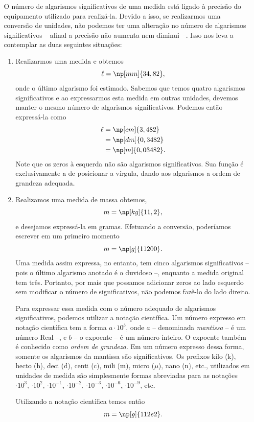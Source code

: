 O número de algarismos significativos de uma medida está ligado à precisão do equipamento utilizado para realizá-la. Devido a isso, se realizarmos uma conversão de unidades, não podemos ter uma alteração no número de algarismos significativos -- afinal a precisão não aumenta nem diminui~--. Isso nos leva a contemplar as duas seguintes situações:
\begin{enumerate}
\item Realizarmos uma medida e obtemos
\begin{equation}
	\ell = \np[mm]{34,82},
\end{equation}
%
onde o último algarismo foi estimado. Sabemos que temos quatro algarismos significativos e ao expressarmos esta medida em outras unidades, devemos manter o mesmo número de algarismos significativos. Podemos então expressá-la como
\begin{align}
	\ell &= \np[cm]{3,482} \\
	&= \np[dm]{0,3482} \\
	&= \np[m]{0,03482}.
\end{align}
%
Note que os zeros à esquerda não são algarismos significativos. Sua função é exclusivamente a de posicionar a vírgula, dando aos algarismos a ordem de grandeza adequada.

\item Realizamos uma medida de massa obtemos,
\begin{equation}
	m = \np[kg]{11,2},
\end{equation}
%
e desejamos expressá-la em gramas. Efetuando a conversão, poderíamos escrever em um primeiro momento
\begin{equation}
	m = \np[g]{11200}.
\end{equation}
%
Uma medida assim expressa, no entanto, tem cinco algarismos significativos -- pois o último algarismo anotado é o duvidoso --, enquanto a medida original tem três.  Portanto, por mais que possamos adicionar zeros ao lado esquerdo sem modificar o número de significativos, não podemos fazê-lo do lado direito. 

Para expressar essa medida com o número adequado de algarismos significativos, podemos utilizar a notação científica. Um número expresso em notação científica tem a forma $a \cdot 10^b$, onde $a$ -- denominada \emph{mantissa} -- é um número Real --, e $b$ -- o expoente -- é um número inteiro. O expoente também é conhecido como \emph{ordem de grandeza}. Em um número expresso dessa forma, somente os algarismos da mantissa são significativos. Os prefixos kilo (k), hecto (h), deci (d), centi (c), mili (m), micro ($\mu$), nano (n), etc., utilizados em unidades de medida são simplesmente formas abreviadas para as notações $\cdot 10^{3}$, $\cdot 10^{2}$, $\cdot 10^{-1}$, $\cdot 10^{-2}$, $\cdot 10^{-3}$, $\cdot 10^{-6}$, $\cdot 10^{-9}$, etc.

Utilizando a notação científica temos então
\begin{equation}
	m = \np[g]{112e2}.
\end{equation}
\end{enumerate}

